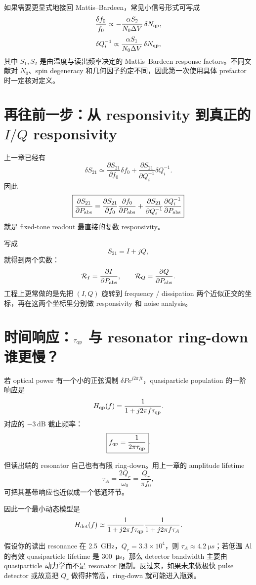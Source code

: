 \documentclass[11pt,a4paper,openany]{ctexrep}
\begin{document}
如果需要更显式地接回 Mattis--Bardeen，常见小信号形式可写成
\[
\frac{\delta f_0}{f_0}
\propto
-\frac{\alpha S_2}{N_0\Delta V}\,\delta N_{\rm qp},
\]
\[
\delta Q_i^{-1}
\propto
\frac{\alpha S_1}{N_0\Delta V}\,\delta N_{\rm qp},
\]
其中 $S_1,S_2$ 是由温度与读出频率决定的 Mattis--Bardeen response factors。不同文献对 $N_0$、spin degeneracy 和几何因子约定不同，因此第一次使用具体 prefactor 时一定核对定义。

\section{再往前一步：从 responsivity 到真正的 $I/Q$ responsivity}

上一章已经有
\[
\delta S_{21}
\simeq
\frac{\partial S_{21}}{\partial f_0}\delta f_0
+
\frac{\partial S_{21}}{\partial Q_i^{-1}}\delta Q_i^{-1}.
\]
因此
\[
\boxed{
\frac{\partial S_{21}}{\partial P_{\rm abs}}
=
\frac{\partial S_{21}}{\partial f_0}
\frac{\partial f_0}{\partial P_{\rm abs}}
+
\frac{\partial S_{21}}{\partial Q_i^{-1}}
\frac{\partial Q_i^{-1}}{\partial P_{\rm abs}}
}
\]
就是 fixed-tone readout 最直接的复数 responsivity。

写成
\[
S_{21}=I+jQ,
\]
就得到两个实数：
\[
\mathcal R_I=\frac{\partial I}{\partial P_{\rm abs}},
\qquad
\mathcal R_Q=\frac{\partial Q}{\partial P_{\rm abs}}.
\]
工程上更常做的是先把 $(I,Q)$ 旋转到 frequency / dissipation 两个近似正交的坐标，再在这两个坐标里分别做 responsivity 和 noise analysis。

\section{时间响应：$\tau_{\rm qp}$ 与 resonator ring-down 谁更慢？}

若 optical power 有一个小的正弦调制 $\delta P e^{j2\pi ft}$，quasiparticle population 的一阶响应是
\[
H_{\rm qp}(f)=\frac{1}{1+j2\pi f\tau_{\rm qp}}.
\]
对应的 $-3\,\mathrm{dB}$ 截止频率：
\[
\boxed{f_{\rm qp}=\frac{1}{2\pi\tau_{\rm qp}}}.
\]

但读出端的 resonator 自己也有有限 ring-down。用上一章的 amplitude lifetime
\[
\tau_A=\frac{2Q_r}{\omega_0}
=\frac{Q_r}{\pi f_0},
\]
可把其基带响应也近似成一个低通环节。

因此一个最小动态模型是
\[
H_{\rm det}(f)
\simeq
\frac{1}{1+j2\pi f\tau_{\rm qp}}
\frac{1}{1+j2\pi f\tau_A}.
\]

\begin{projectbox}
假设你的读出 resonance 在 \SI{2.5}{GHz}，$Q_r=3.3\times10^4$，则 $\tau_A\approx\SI{4.2}{\micro s}$；若低温 Al 的有效 quasiparticle lifetime 是 \SI{300}{\micro s}，那么 detector bandwidth 主要由 quasiparticle 动力学而不是 resonator 限制。反过来，如果未来做极快 pulse detector 或故意把 $Q_r$ 做得非常高，ring-down 就可能进入瓶颈。
\end{projectbox}
\end{document}
